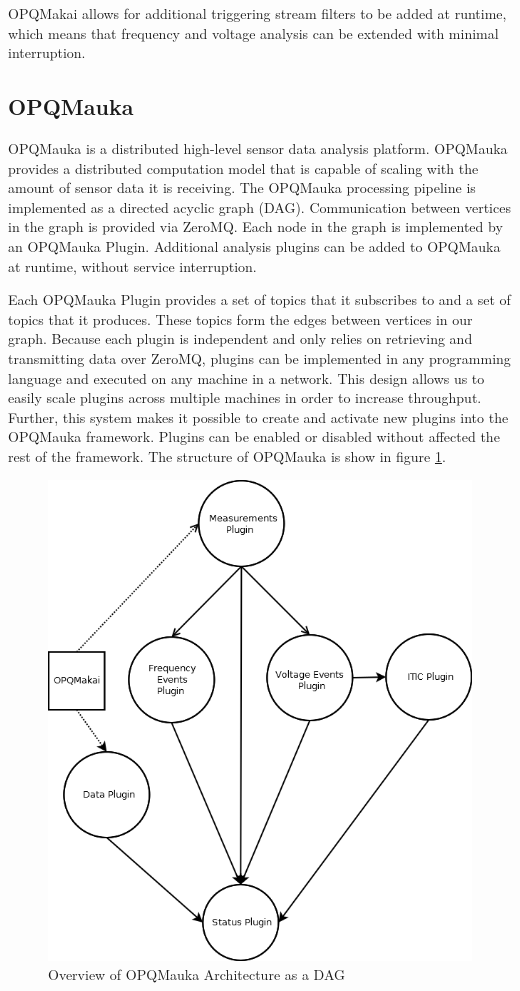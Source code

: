 \documentclass[a4paper, conference]{IEEEtran}
\begin{document}
OPQMakai allows for additional triggering stream filters to be added at runtime, which means that frequency and voltage analysis can be extended with minimal interruption.

\subsection{OPQMauka}
OPQMauka is a distributed high-level sensor data analysis platform. OPQMauka provides a distributed computation model that is capable of scaling with the amount of sensor data it is receiving. The OPQMauka processing pipeline is implemented as a directed acyclic graph (DAG). Communication between vertices in the graph is provided via ZeroMQ. Each node in the graph is implemented by an OPQMauka Plugin. Additional analysis plugins can be added to OPQMauka at runtime, without service interruption.

Each OPQMauka Plugin provides a set of topics that it subscribes to and a set of topics that it produces. These topics form the edges between vertices in our graph. Because each plugin is independent and only relies on retrieving and transmitting data over ZeroMQ, plugins can be implemented in any programming language and executed on any machine in a network. This design allows us to easily scale plugins across multiple machines in order to increase throughput. Further, this system makes it possible to create and activate new plugins into the OPQMauka framework. Plugins can be enabled or disabled without affected the rest of the framework. The structure of OPQMauka is show in figure \ref{fig:opqmauka}.

\begin{figure}
	\includegraphics[width=1.0\linewidth]{img/opqmauka}
	\caption[OPQ Mauka DAG]{Overview of OPQMauka Architecture as a DAG}
	\label{fig:opqmauka}
\end{figure}
\end{document}
